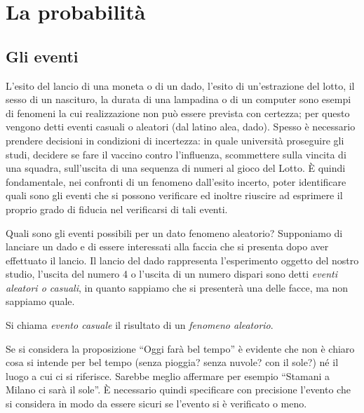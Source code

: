 
\chapter{La probabilità}

\section{Gli eventi}
\label{sec:09_eventi}

L'esito del lancio di una moneta o di un dado, l'esito di un'estrazione del 
lotto, il sesso di un nascituro, la durata di una lampadina o di un 
computer sono esempi di fenomeni la cui realizzazione non può essere 
prevista con certezza; per questo vengono detti eventi casuali o aleatori 
(dal latino alea, dado). 
Spesso è necessario prendere decisioni in condizioni di incertezza: in quale 
università proseguire gli studi, decidere se fare il vaccino contro 
l'influenza, scommettere sulla vincita di una squadra, sull'uscita di una 
sequenza di numeri al gioco del Lotto. 
È quindi fondamentale, nei confronti di un fenomeno dall'esito incerto, 
poter identificare quali sono gli eventi che si possono verificare ed 
inoltre riuscire ad esprimere il proprio grado di fiducia nel verificarsi di 
tali eventi.

Quali sono gli eventi possibili per un dato fenomeno aleatorio? 
Supponiamo di lanciare un dado e di essere interessati alla faccia che si 
presenta dopo aver effettuato il lancio. 
Il lancio del dado rappresenta l'esperimento oggetto 
del nostro studio, l'uscita del numero 4 o l'uscita di un numero dispari 
sono detti \emph{eventi aleatori o casuali}, in quanto sappiamo che si 
presenterà una delle facce, ma non sappiamo quale.

\begin{definizione}
Si chiama \emph{evento casuale} il risultato di un \emph{fenomeno 
aleatorio}.
\end{definizione}

Se si considera la proposizione ``Oggi farà bel tempo'' è evidente che non 
è chiaro cosa si intende per bel tempo (senza pioggia? senza nuvole? con il 
sole?) né il luogo a cui ci si riferisce. 
Sarebbe meglio affermare per esempio ``Stamani a Milano ci sarà il sole''. 
È necessario quindi specificare con precisione l'evento che si considera in 
modo da essere sicuri se l'evento si è verificato o meno.

